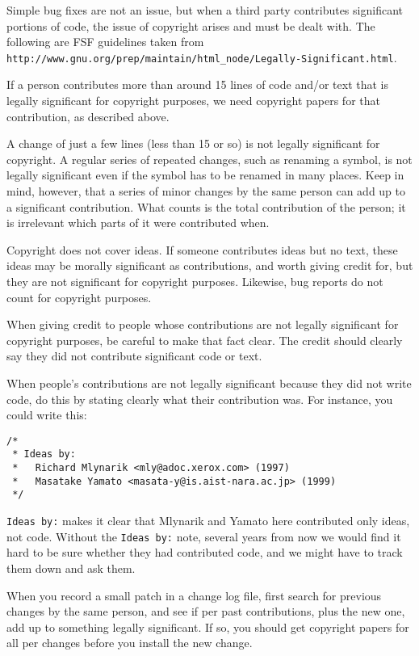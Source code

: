 \label{section:significantChanges}

Simple bug fixes are not an issue, but when a third party contributes significant portions of code, the issue of copyright arises and must be dealt with. The following are FSF guidelines taken from 
{\tt http://www.gnu.org/prep/maintain/html\_node/Legally-Significant.html}.

If a person contributes more than around 15 lines of code and/or text that is legally significant for copyright purposes, we need copyright papers for that contribution, as described above.
 
A change of just a few lines (less than 15 or so) is not legally significant for copyright. A regular series of repeated changes, such as renaming a symbol, is not legally significant even if the symbol has to be renamed in many places. Keep in mind, however, that a series of minor changes by the same person can add up to a significant contribution. What counts is the total contribution of the person; it is irrelevant which parts of it were contributed when.
 
Copyright does not cover ideas. If someone contributes ideas but no text, these ideas may be morally significant as contributions, and worth giving credit for, but they are not significant for copyright purposes. Likewise, bug reports do not count for copyright purposes.
 
When giving credit to people whose contributions are not legally significant for copyright purposes, be careful to make that fact clear. The credit should clearly say they did not contribute significant code or text.
 
When people’s contributions are not legally significant because they did not write code, do this by stating clearly what their contribution was. For instance, you could write this:
 
\begin{verbatim}
/*
 * Ideas by:
 *   Richard Mlynarik <mly@adoc.xerox.com> (1997)
 *   Masatake Yamato <masata-y@is.aist-nara.ac.jp> (1999)
 */
\end{verbatim}

{\tt Ideas by:} makes it clear that Mlynarik and Yamato here contributed only ideas, not code. 
Without the {\tt Ideas by:} note, several years from now we would find it hard to be sure whether they had contributed code, and we might have to track them down and ask them.
 
When you record a small patch in a change log file, first search for previous changes by the same person, and see if per past contributions, plus the new one, add up to something legally significant. If so, you should get copyright papers for all per changes before you install the new change.
 
